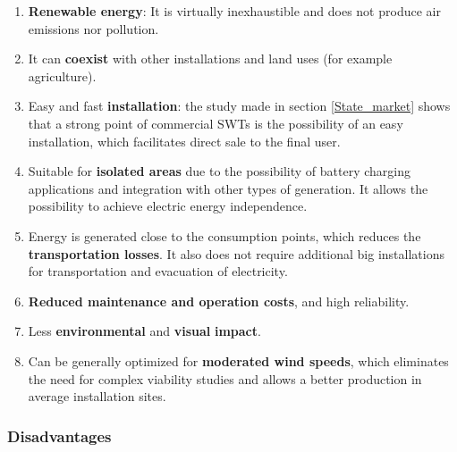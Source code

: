 \documentclass[../TFG_Report.tex]{subfiles}
\begin{document}
\begin{enumerate}
	\item \textbf{Renewable energy}: It is virtually inexhaustible and does not produce air emissions nor pollution. 
	
	\item It can \textbf{coexist} with other installations and land uses (for example agriculture).
	
	\item Easy and fast \textbf{installation}: the study made in section \ref{State_market} shows that a strong point of commercial SWTs is the possibility of an easy installation, which facilitates direct sale to the final user.
	 
	\item Suitable for \textbf{isolated areas} due to the possibility of battery charging applications and integration with other types of generation. It allows the possibility to achieve electric energy independence. 
	
	\item Energy is generated close to the consumption points, which reduces the \textbf{transportation losses}. It also does not require additional big installations for transportation and evacuation of electricity.
	
	\item \textbf{Reduced maintenance and operation costs}, and high reliability. 
	  
	\item Less \textbf{environmental} and \textbf{visual} \textbf{impact}. 
	
	\item Can be generally optimized for \textbf{moderated wind speeds}, which eliminates the need for complex viability studies and allows a better production in average installation sites. 
	
\end{enumerate}


\subsubsection{Disadvantages}
\end{document}
